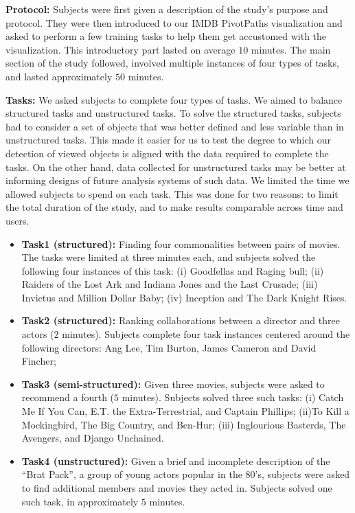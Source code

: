 \textbf{Protocol:} Subjects were first given a description of the study's purpose and protocol. They were then introduced to our IMDB PivotPaths visualization and asked to perform a few training tasks to help them get accustomed with the visualization. This introductory part lasted on average $10$ minutes. The main section of the study followed, involved multiple instances of four types of tasks, and lasted approximately $50$ minutes. 


\textbf{Tasks:} We asked subjects to complete four types of tasks. We aimed to balance structured tasks and unstructured tasks. To solve the structured tasks, subjects had to consider a set of objects that was better defined and less variable than in unstructured tasks. This made it easier for us to test the degree to which our detection of viewed objects is aligned with the data required to complete the tasks. On the other hand, data collected for unstructured tasks may be better at informing designs of future analysis systems of such data. We limited the time we allowed subjects to spend on each task. This was done for two reasons: to limit the total duration of the study, and to make results comparable across time and users.

\begin{itemize}
\item \textbf{Task1 (structured):} Finding four commonalities between pairs of movies. The tasks were limited at three minutes each, and subjects solved the following four instances of this task: (i) Goodfellas and Raging bull; (ii) Raiders of the Lost Ark and Indiana Jones and the Last Crusade; (iii) Invictus and Million Dollar Baby; (iv) Inception and The Dark Knight Rises.  
\item \textbf{Task2 (structured):} Ranking collaborations between a director and three actors ($2$ minutes).  Subjects complete four task instances centered around the following directors: Ang Lee, Tim Burton, James Cameron and David Fincher; 
\item \textbf{Task3 (semi-structured):} Given three movies, subjects were asked to recommend a fourth ($5$ minutes). Subjects solved three such tasks: (i) Catch Me If You Can, E.T. the Extra-Terrestrial, and Captain Phillips; (ii)To Kill a Mockingbird, The Big Country, and Ben-Hur; (iii) Inglourious Basterds, The Avengers, and Django Unchained.



\item \textbf{Task4 (unstructured):} Given a brief and incomplete description of the ``Brat Pack'', a group of young actors popular in the 80's, subjects were asked to find additional members and movies they acted in. Subjects solved one such task, in approximately $5$ minutes. 
\end{itemize}


